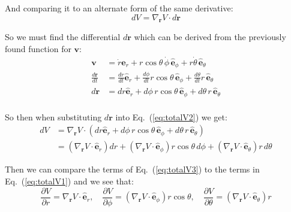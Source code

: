 \documentclass[titlepage]{article}
\begin{document}
And comparing it to an alternate form of the same derivative:
\begin{equation}
	dV=\nabla_{\boldsymbol{r}}V\cdot d\boldsymbol{r}
	\label{eq:totalV2}
\end{equation}

So we must find the differential $d\boldsymbol{r}$ which can be derived from the previously found function for $\boldsymbol{v}$:
\begin{equation}
	\begin{split}
		\boldsymbol{v}&=\dot{r}\hat{\boldsymbol{e}}_r+r\cos\theta\,\dot{\phi}\,\hat{\boldsymbol{e}}_\phi+r\dot{\theta}\,\hat{\boldsymbol{e}}_\theta \\
		\frac{d\boldsymbol{r}}{dt}&=\frac{dr}{dt}\hat{\boldsymbol{e}}_r+\frac{d\phi}{dt}r\cos\theta\,\hat{\boldsymbol{e}}_\phi+\frac{d\theta}{dt}r\,\hat{\boldsymbol{e}}_\theta \\
		d\boldsymbol{r}&=dr\hat{\boldsymbol{e}}_r+d\phi\,r\cos\theta\,\hat{\boldsymbol{e}}_\phi+d\theta\,r\,\hat{\boldsymbol{e}}_\theta \\
	\end{split}
\end{equation}

So then when substituting $d\boldsymbol{r}$ into Eq.~(\ref{eq:totalV2}) we get:
\begin{equation}
	\begin{split}
		dV&=\nabla_{\boldsymbol{r}}V\cdot\left(dr\hat{\boldsymbol{e}}_r+d\phi\,r\cos\theta\,\hat{\boldsymbol{e}}_\phi+d\theta\,r\,\hat{\boldsymbol{e}}_\theta\right) \\
		&=\left(\nabla_{\boldsymbol{r}}V\cdot\hat{\boldsymbol{e}}_r\right)dr+\left(\nabla_{\boldsymbol{r}}V\cdot\hat{\boldsymbol{e}}_\phi\right)r\cos\theta\,d\phi+\left(\nabla_{\boldsymbol{r}}V\cdot\hat{\boldsymbol{e}}_\theta\right)r\,d\theta
	\end{split}
	\label{eq:totalV3}
\end{equation}

Then we can compare the terms of Eq.~(\ref{eq:totalV3}) to the terms in Eq.~(\ref{eq:totalV1}) and we see that:
\begin{equation}
	\frac{\partial V}{\partial r}=\nabla_{\boldsymbol{r}}V\cdot\hat{\boldsymbol{e}}_r,\quad\frac{\partial V}{\partial\phi}=\left(\nabla_{\boldsymbol{r}}V\cdot\hat{\boldsymbol{e}}_\phi\right)r\cos\theta,\quad\frac{\partial V}{\partial\theta}=\left(\nabla_{\boldsymbol{r}}V\cdot\hat{\boldsymbol{e}}_\theta\right)r
\end{equation}
\end{document}
